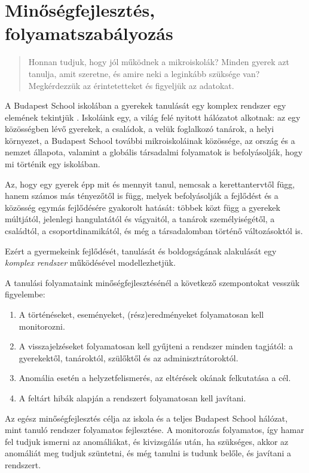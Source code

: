 \section{Minőségfejlesztés, folyamatszabályozás}
\label{sec:minosegbiztositas}
\begin{quote}
      Honnan tudjuk, hogy jól működnek a mikroiskolák? Minden gyerek azt
      tanulja,
      amit szeretne, és amire neki a leginkább szüksége van? Megkérdezzük az
      érintetetteket és figyeljük az adatokat.
\end{quote}

A Budapest School iskolában a gyerekek tanulását egy komplex rendszer egy
elemének tekintjük \citep{barabasi}. Iskoláink egy, a világ felé nyitott
hálózatot alkotnak: az egy közösségben lévő gyerekek, a családok, a velük
foglalkozó tanárok, a helyi környezet, a Budapest School további
mikroiskoláinak közössége, az ország és a nemzet állapota, valamint a globális
társadalmi folyamatok is befolyásolják, hogy mi történik egy iskolában.

Az, hogy egy gyerek épp mit és mennyit tanul, nemcsak a kerettantervtől függ,
hanem számos más tényezőtől is függ, melyek befolyásolják a fejlődést és a
közösség egymás fejlődésére gyakorolt hatását: többek közt függ a gyerekek
múltjától, jelenlegi hangulatától és vágyaitól, a tanárok személyiségétől, a
családtól, a csoportdinamikától, és még a társadalomban történő változásoktól
is.

Ezért a gyermekeink fejlődését, tanulását és boldogságának alakulását egy
\emph{komplex rendszer} működésével modellezhetjük.

A tanulási folyamataink minőségfejlesztésénél a következő szempontokat vesszük
figyelembe:
\begin{enumerate}
      \item  A történéseket, eseményeket, (rész)eredményeket folyamatosan kell
            monitorozni.
      \item  A visszajelzéseket folyamatosan kell gyűjteni a rendszer minden
            tagjától: a gyerekektől, tanároktól, szülőktől és az
            adminisztrátoroktól.
      \item Anomália esetén a helyzetfelismerés, az eltérések okának
            felkutatása a
            cél.
      \item A feltárt hibák alapján a rendszert folyamatosan kell javítani.
\end{enumerate}

Az egész minőségfejlesztés célja az iskola és a teljes	Budapest School
hálózat, mint tanuló rendszer folyamatos fejlesztése. A monitorozás folyamatos,
így hamar fel tudjuk ismerni az anomáliákat, és kivizsgálás után, ha szükséges,
akkor az anomáliát meg tudjuk szüntetni, és még tanulni is tudunk belőle, és
javítani a rendszert.

